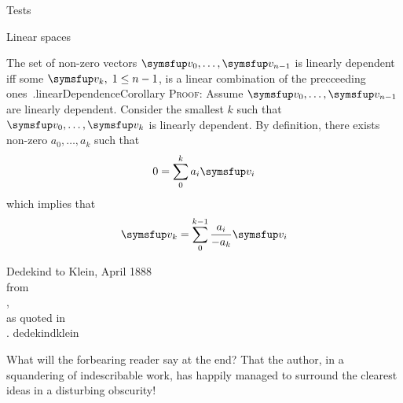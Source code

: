 \documentclass{PalisadesLakesArticle}
\begin{document}
\begin{plSection}{Tests}
\begin{plSection}{Linear spaces}
\begin{plCorollary}{The set of non-zero vectors
 $\Vector{v}_0, \ldots ,\Vector{v}_{n-1}$
is linearly dependent iff some $\Vector{v}_k, \; 1 \leq n-1$, 
is a linear combination of the precceeding 
ones~\cite[Section 6]{Halmos:1958:Finite}.}{linearDependenceCorollary}
\textsc{Proof:}
Assume  $\Vector{v}_0, \ldots ,\Vector{v}_{n-1}$ are linearly dependent.
Consider the smallest $k$ such that 
$\Vector{v}_0, \ldots ,\Vector{v}_{k}$ is linearly dependent.
By definition,
there exists non-zero $a_0, \ldots ,a_{k}$ such that
\begin{equation}
0 = \sum_0^k a_i \Vector{v}_i
\end{equation}
which implies that
\begin{equation}
\Vector{v}_k = \sum_0^{k-1} \frac{a_i}{- a_k} \Vector{v}_i
\end{equation}
\end{plCorollary}
\end{plSection}%
\begin{plQuote}
{Dedekind to Klein, April 1888\\ 
from\\ ,\\
as quoted in\\ .}
{dedekindklein}
{\fraklines
{}
\par
{}
\par
{}
\par
}
What will the forbearing reader say at the end? That the author, 
in a squandering of indescribable
work, has happily managed to surround the clearest ideas
 in a disturbing obscurity!
\end{plQuote}


\end{plSection}
\end{document}
